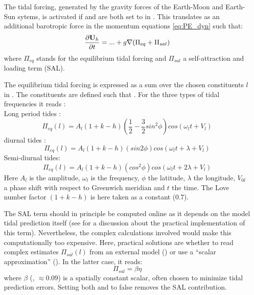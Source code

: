 \documentclass[../tex_main/NEMO_manual]{subfiles}
\begin{document}


The tidal forcing, generated by the gravity forces of the Earth-Moon and Earth-Sun sytems, is activated if  and  are both set to  in . This translates as an additional barotropic force in the momentum equations \ref{eq:PE_dyn} such that:
\begin{equation}     \label{eq:PE_dyn_tides}
\frac{\partial {\rm {\bf U}}_h }{\partial t}= ...
+g\nabla (\Pi_{eq} + \Pi_{sal}) 
\end{equation} 
where $\Pi_{eq}$ stands for the equilibrium tidal forcing and $\Pi_{sal}$ a self-attraction and loading term (SAL). 
 
The equilibrium tidal forcing is expressed as a sum over the chosen constituents $l$ in . The constituents are defined such that . For the three types of tidal frequencies it reads : \\
Long period tides :
\begin{equation}
\Pi_{eq}(l)=A_{l}(1+k-h)(\frac{1}{2}-\frac{3}{2}sin^{2}\phi)cos(\omega_{l}t+V_{l})
\end{equation}
diurnal tides :
\begin{equation}
\Pi_{eq}(l)=A_{l}(1+k-h)(sin 2\phi)cos(\omega_{l}t+\lambda+V_{l})
\end{equation}
Semi-diurnal tides:
\begin{equation}
\Pi_{eq}(l)=A_{l}(1+k-h)(cos^{2}\phi)cos(\omega_{l}t+2\lambda+V_{l})
\end{equation}
Here $A_{l}$ is the amplitude, $\omega_{l}$ is the frequency, $\phi$ the latitude, $\lambda$ the longitude, $V_{0l}$ a phase shift with respect to Greenwich meridian and $t$ the time. The Love number factor $(1+k-h)$ is here taken as a constant (0.7).

The SAL term should in principle be computed online as it depends on the model tidal prediction itself (see \citet{Arbic2004} for a discussion about the practical implementation of this term). Nevertheless, the complex calculations involved would make this computationally too expensive. Here, practical solutions are whether to read complex estimates $\Pi_{sal}(l)$ from an external model () or use a ``scalar approximation'' (). In the latter case, it reads:\\
\begin{equation}
\Pi_{sal} = \beta \eta
\end{equation}
where $\beta$ (, $\approx0.09$) is a spatially constant scalar, often chosen to minimize tidal prediction errors. Setting both  and  to false removes the SAL contribution.
\end{document}
